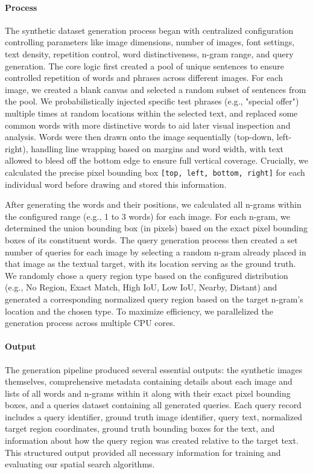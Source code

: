 \documentclass[sigconf,screen]{acmart}
\begin{document}
\paragraph{Process} The synthetic dataset generation process began with centralized configuration controlling parameters like image dimensions, number of images, font settings, text density, repetition control, word distinctiveness, n-gram range, and query generation. The core logic first created a pool of unique sentences to ensure controlled repetition of words and phrases across different images. For each image, we created a blank canvas and selected a random subset of sentences from the pool. We probabilistically injected specific test phrases (e.g., "special offer") multiple times at random locations within the selected text, and replaced some common words with more distinctive words to aid later visual inspection and analysis. Words were then drawn onto the image sequentially (top-down, left-right), handling line wrapping based on margins and word width, with text allowed to bleed off the bottom edge to ensure full vertical coverage. Crucially, we calculated the precise pixel bounding box \verb|[top, left, bottom, right]| for each individual word before drawing and stored this information.

After generating the words and their positions, we calculated all n-grams within the configured range (e.g., 1 to 3 words) for each image. For each n-gram, we determined the union bounding box (in pixels) based on the exact pixel bounding boxes of its constituent words. The query generation process then created a set number of queries for each image by selecting a random n-gram already placed in that image as the textual target, with its location serving as the ground truth. We randomly chose a query region type based on the configured distribution (e.g., No Region, Exact Match, High IoU, Low IoU, Nearby, Distant) and generated a corresponding normalized query region based on the target n-gram's location and the chosen type. To maximize efficiency, we parallelized the generation process across multiple CPU cores.

\paragraph{Output} The generation pipeline produced several essential outputs: the synthetic images themselves, comprehensive metadata containing details about each image and lists of all words and n-grams within it along with their exact pixel bounding boxes, and a queries dataset containing all generated queries. Each query record includes a query identifier, ground truth image identifier, query text, normalized target region coordinates, ground truth bounding boxes for the text, and information about how the query region was created relative to the target text. This structured output provided all necessary information for training and evaluating our spatial search algorithms.
\end{document}
